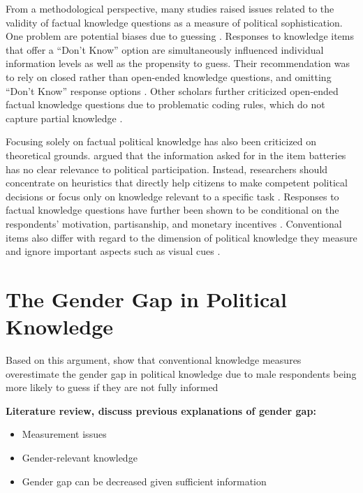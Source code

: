 \documentclass[12pt]{article}
\begin{document}
From a methodological perspective, many studies raised issues related to the validity of factual knowledge questions as a measure of political sophistication. One problem  are potential biases due to guessing \citep{mondak2000reconsidering,mondak2001developing,mondak2001asked,miller2008experimenting}. Responses to knowledge items that offer a ``Don't Know'' option are simultaneously influenced individual information levels as well as the propensity to guess. Their recommendation was to rely on closed rather than open-ended knowledge questions, and omitting ``Don't Know'' response options \citep[but see][]{sturgis2008experiment,luskin2011don}. Other scholars further criticized open-ended factual knowledge questions due to problematic coding rules, which do not capture partial knowledge \citep{krosnick2008problems,gibson2009knowing,debell2013harder}.

Focusing solely on factual political knowledge has also been criticized on theoretical grounds. \citet{lupia2006elitism} argued that the information asked for in the item batteries has no clear relevance to political participation. Instead, researchers should concentrate on heuristics that directly help citizens to make competent political decisions or focus only on knowledge relevant to a specific task \citep[see also][]{lupia1994shortcuts}. Responses to factual knowledge questions have further been shown to be conditional on the respondents' motivation, partisanship, and monetary incentives \citep{prior2008money,bullock2015partisan,prior2015you}. Conventional items also differ with regard to the dimension of political knowledge they measure \citep{barabas2014question} and ignore important aspects such as visual cues \citep{prior2014visual}.



\section*{The Gender Gap in Political Knowledge}


Based on this argument, \citet{mondak2004knowledge} show that conventional knowledge measures overestimate the gender gap in political knowledge due to male respondents being more likely to guess if they are not fully informed \citep[see also][]{pietryka2013analysis}

\noindent \textbf{Literature review, discuss previous explanations of gender gap:}
\begin{itemize}\singlespacing
\item Measurement issues \citep[e.g.][]{mondak2004knowledge}
\item Gender-relevant knowledge \citep[e.g.][]{dolan2011women}
\item Gender gap can be decreased given sufficient information \citep[e.g.][]{jerit2017revisiting}
\end{itemize}
\end{document}
